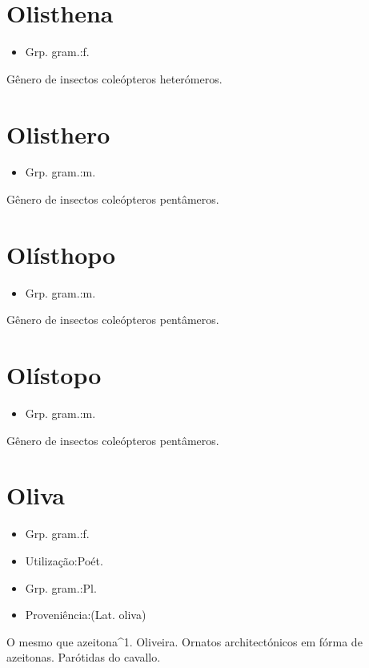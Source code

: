 \section{Olisthena}
\begin{itemize}
\item {Grp. gram.:f.}
\end{itemize}
Gênero de insectos coleópteros heterómeros.
\section{Olisthero}
\begin{itemize}
\item {Grp. gram.:m.}
\end{itemize}
Gênero de insectos coleópteros pentâmeros.
\section{Olísthopo}
\begin{itemize}
\item {Grp. gram.:m.}
\end{itemize}
Gênero de insectos coleópteros pentâmeros.
\section{Olístopo}
\begin{itemize}
\item {Grp. gram.:m.}
\end{itemize}
Gênero de insectos coleópteros pentâmeros.
\section{Oliva}
\begin{itemize}
\item {Grp. gram.:f.}
\end{itemize}
\begin{itemize}
\item {Utilização:Poét.}
\end{itemize}
\begin{itemize}
\item {Grp. gram.:Pl.}
\end{itemize}
\begin{itemize}
\item {Proveniência:(Lat. \textunderscore oliva\textunderscore )}
\end{itemize}
O mesmo que \textunderscore azeitona\textunderscore ^1.
Oliveira.
Ornatos architectónicos em fórma de azeitonas.
Parótidas do cavallo.
